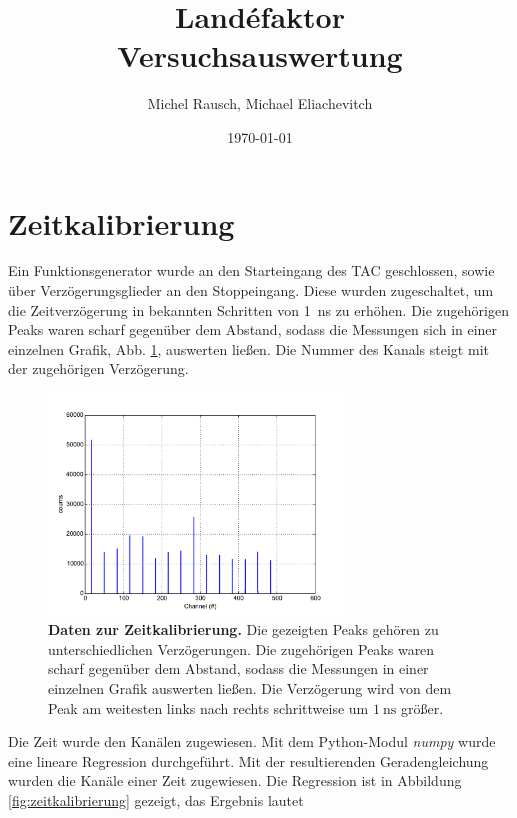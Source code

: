 \documentclass[a4paper,ngerman]{scrartcl}
\title{Landéfaktor\\Versuchsauswertung}
\date{\today}
\author{Michel Rausch, Michael Eliachevitch}
\begin{document}
\maketitle
\tableofcontents
\newpage

\section{Zeitkalibrierung}

Ein Funktionsgenerator wurde an den Starteingang des TAC geschlossen, sowie über Verzögerungsglieder an den Stoppeingang. Diese wurden zugeschaltet, um die Zeitverzögerung in bekannten Schritten von \SI{1}{\nano \second} zu erhöhen. Die zugehörigen Peaks waren scharf gegenüber dem Abstand, sodass die Messungen sich in einer einzelnen Grafik, Abb. \ref{fig:zeitkalibrierung_hist}, auswerten ließen. Die Nummer des Kanals steigt mit der zugehörigen Verzögerung. 

\begin{figure}[tb!]
\centering
\includegraphics[width=0.7\textwidth]{abbildungen/zeitkalibrierung_hist.pdf}
\caption[Daten zur Zeitkalibrierung]{\textbf{Daten zur Zeitkalibrierung.} Die gezeigten Peaks gehören zu unterschiedlichen Verzögerungen. Die zugehörigen Peaks waren scharf gegenüber dem Abstand, sodass die Messungen in einer einzelnen Grafik auswerten ließen. Die Verzögerung wird von dem Peak am weitesten links nach rechts schrittweise um $\SI{1}{\nano \second}$ größer.}
\label{fig:zeitkalibrierung_hist}
\end{figure}


Die Zeit wurde den Kanälen zugewiesen. Mit dem Python-Modul \emph{numpy} wurde eine lineare Regression durchgeführt. Mit der resultierenden Geradengleichung wurden die Kanäle einer Zeit zugewiesen. Die Regression ist in Abbildung \ref{fig:zeitkalibrierung} gezeigt, das Ergebnis lautet
\end{document}
